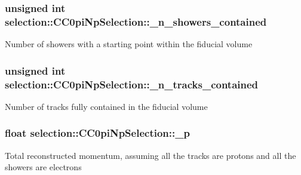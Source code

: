 \subsubsection[{\texorpdfstring{\+\_\+n\+\_\+showers\+\_\+contained}{_n_showers_contained}}]{\setlength{\rightskip}{0pt plus 5cm}unsigned int selection\+::\+C\+C0pi\+Np\+Selection\+::\+\_\+n\+\_\+showers\+\_\+contained\hspace{0.3cm}{\ttfamily [private]}}\hypertarget{classselection_1_1CC0piNpSelection_aebf4a69b8d7f3171ad90c382668c22ec}{}\label{classselection_1_1CC0piNpSelection_aebf4a69b8d7f3171ad90c382668c22ec}
Number of showers with a starting point within the fiducial volume 
\subsubsection[{\texorpdfstring{\+\_\+n\+\_\+tracks\+\_\+contained}{_n_tracks_contained}}]{\setlength{\rightskip}{0pt plus 5cm}unsigned int selection\+::\+C\+C0pi\+Np\+Selection\+::\+\_\+n\+\_\+tracks\+\_\+contained\hspace{0.3cm}{\ttfamily [private]}}\hypertarget{classselection_1_1CC0piNpSelection_a22c5cd4cf8882fa3cbabf25ed86d1f39}{}\label{classselection_1_1CC0piNpSelection_a22c5cd4cf8882fa3cbabf25ed86d1f39}
Number of tracks fully contained in the fiducial volume 
\subsubsection[{\texorpdfstring{\+\_\+p}{_p}}]{\setlength{\rightskip}{0pt plus 5cm}float selection\+::\+C\+C0pi\+Np\+Selection\+::\+\_\+p\hspace{0.3cm}{\ttfamily [private]}}\hypertarget{classselection_1_1CC0piNpSelection_afae64b232d6b3526032b289c91b092cb}{}\label{classselection_1_1CC0piNpSelection_afae64b232d6b3526032b289c91b092cb}
Total reconstructed momentum, assuming all the tracks are protons and all the showers are electrons 
